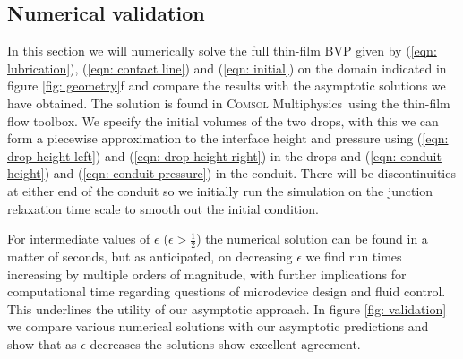 \documentclass{jfm}
\newcommand{\note}[1]{{\color{Ncolour} \fontsize{14}{16.8}\selectfont \textbf{#1}}}
\begin{document}
 
\subsection{Numerical validation} \label{sec: numerics}
% 
In this section we will numerically  solve  the full thin-film BVP given by  (\ref{eqn: lubrication}), (\ref{eqn: contact line})  and (\ref{eqn: initial}) on the domain   indicated in  {f}igure \ref{fig: geometry}f and compare the results with the asymptotic solutions we have obtained. 
The solution is  found  in \textsc{Comsol} Multiphysics\textregistered \  using the thin-film flow  toolbox.  
We specify the initial volumes of the two drops,  with this we can form a piecewise approximation to  the interface height and pressure using (\ref{eqn: drop height left}) and (\ref{eqn: drop height right})   in the drops and  (\ref{eqn:  conduit  height})     and   (\ref{eqn:  conduit  pressure}) in the conduit.
There will be discontinuities at either end of the conduit so we initially run the simulation on the junction relaxation time scale to smooth out the initial condition.

For intermediate values of $\epsilon$ ($\epsilon >\frac{1}{2}$) the numerical solution can be found in a matter of seconds, but as   anticipated,  on decreasing  $\epsilon$ we find run times increasing by multiple orders of magnitude,  with further implications for  computational time regarding    questions of microdevice design and fluid control. 
This underlines the utility of our asymptotic approach.
In figure \ref{fig: validation} we compare  various numerical solutions with our asymptotic predictions and show that as $\epsilon$ decreases  the solutions show excellent agreement.
\end{document}
